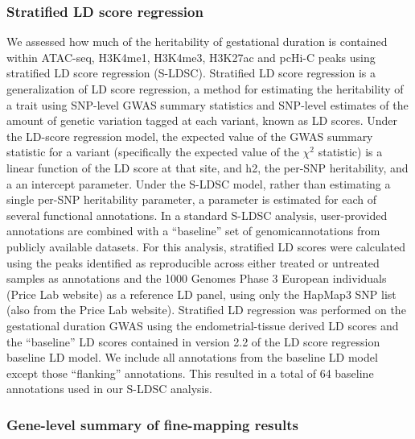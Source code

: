 \subsubsection{Stratified LD score regression}\label{sec:org3173e32}

We assessed how much of the heritability of  gestational duration is contained within ATAC-seq, H3K4me1, H3K4me3, H3K27ac and pcHi-C peaks using stratified LD score regression (S-LDSC).
Stratified LD score regression is a generalization of LD score regression, a method for estimating the heritability of a trait using SNP-level GWAS summary statistics and SNP-level estimates
of the amount of genetic variation tagged at each variant, known as LD scores.  Under the LD-score regression model, the expected value of the GWAS summary statistic for a variant
(specifically 
the expected value of the \(\chi^2\) statistic) is a linear function of the LD score at that site, and h2, the per-SNP heritability, and a an intercept parameter.  Under the S-LDSC
model, rather than estimating a single per-SNP heritability parameter, a parameter is estimated for each of several functional annotations.  In a standard S-LDSC analysis,
user-provided annotations are combined with a ``baseline'' set of genomicannotations from publicly available datasets.  For this analysis, stratified LD scores were calculated using
the peaks identified as reproducible across either treated or untreated samples as annotations and the  1000 Genomes Phase 3 European individuals (Price Lab website) as a reference
LD panel, using only the HapMap3 SNP list (also from the Price Lab website). Stratified LD regression was performed on the gestational duration GWAS using the endometrial-tissue
derived LD scores and the “baseline” LD scores contained in version 2.2 of the LD score regression baseline LD model. We include all annotations from the baseline LD model 
except those “flanking” annotations. This resulted in a total of 64 baseline annotations used in our S-LDSC analysis.  



\subsubsection{Gene-level summary of fine-mapping results}\label{sec:org3f48450}

